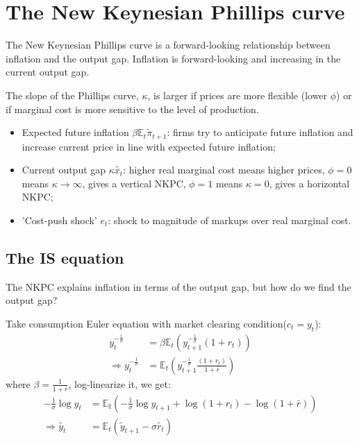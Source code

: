 \section{The New Keynesian Phillips curve}
The New Keynesian Phillips curve is a forward-looking relationship between inflation and the output gap.
Inflation is forward-looking and increasing in the current output gap.

The slope of the Phillips curve, $\kappa$, is larger if prices are more
flexible (lower $\phi$) or if marginal cost is more sensitive to the level of production.

\begin{itemize}
    \item Expected future inﬂation $\beta \mathbb{E}_t \tilde{\pi}_{t+1}$: ﬁrms try to anticipate future
    inﬂation and increase current price in line with expected future inﬂation;
    \item Current output gap $\kappa\tilde{x_t}$: higher real marginal cost means higher prices, $\phi =0$ means $\kappa \to \infty$,
    gives a vertical NKPC, $\phi = 1$ means $\kappa = 0$, gives a horizontal NKPC;
    \item 'Cost-push shock' $e_t$: shock to magnitude of markups over real marginal cost.
\end{itemize}

\subsection{The IS equation}
The NKPC explains inflation in terms of the output gap, but how do we find the output gap?

Take consumption Euler equation with market clearing condition($c_t = y_t$):
\begin{align*}
    y_t^{-\frac{1}{\sigma}} &= \beta \mathbb{E}_t \left(y_{t+1}^{-\frac{1}{\sigma}}(1+r_{t})\right) \\
    \Rightarrow y_t^{-\frac{1}{\sigma}} &= \mathbb{E}_t \left(y_{t+1}^{-\frac{1}{\sigma}} \frac{(1+r_{t})}{1+\bar{r}}\right)
\end{align*}
where $\beta  = \frac{1}{1+\bar{r}}$, log-linearize it, we get:
\begin{align*}
    -\frac{1}{\sigma}\log y_t &= \mathbb{E_t}\left(-\frac{1}{\sigma}\log y_{t+1} + \log{(1+r_t)} - \log{(1+\bar{r})} \right) \\
    \Rightarrow \tilde{y_t} &= \mathbb{E}_t \left(\tilde{y}_{t+1} - \sigma \tilde{r_t} \right)
\end{align*}

